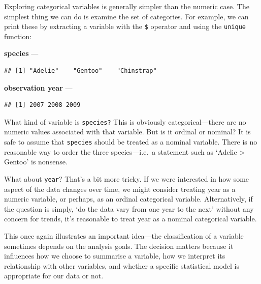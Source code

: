 \documentclass[
]{book}
\newenvironment{Shaded}{\begin{snugshade}}{\end{snugshade}}
\newcommand{\FunctionTok}[1]{\textcolor[rgb]{0.00,0.00,0.00}{#1}}
\newcommand{\NormalTok}[1]{#1}
\newcommand{\SpecialCharTok}[1]{\textcolor[rgb]{0.00,0.00,0.00}{#1}}
\begin{document}
Exploring categorical variables is generally simpler than the numeric case. The simplest thing we can do is examine the set of categories. For example, we can print these by extracting a variable with the \texttt{\$} operator and using the \texttt{unique} function:

\textbf{species} ---

\begin{Shaded}
\end{Shaded}

\begin{verbatim}
## [1] "Adelie"    "Gentoo"    "Chinstrap"
\end{verbatim}

\textbf{observation year} ---

\begin{Shaded}
\end{Shaded}

\begin{verbatim}
## [1] 2007 2008 2009
\end{verbatim}

What kind of variable is \texttt{species?} This is obviously categorical---there are no numeric values associated with that variable. But is it ordinal or nominal? It is safe to assume that \texttt{species} should be treated as a nominal variable. There is no reasonable way to order the three species---i.e.~a statement such as `Adelie \textgreater{} Gentoo' is nonsense.

What about \texttt{year}? That's a bit more tricky. If we were interested in how some aspect of the data changes over time, we might consider treating year as a numeric variable, or perhaps, as an ordinal categorical variable. Alternatively, if the question is simply, `do the data vary from one year to the next' without any concern for trends, it's reasonable to treat year as a nominal categorical variable.

This once again illustrates an important idea---the classification of a variable sometimes depends on the analysis goals. The decision matters because it influences how we choose to summarise a variable, how we interpret its relationship with other variables, and whether a specific statistical model is appropriate for our data or not.
\end{document}

